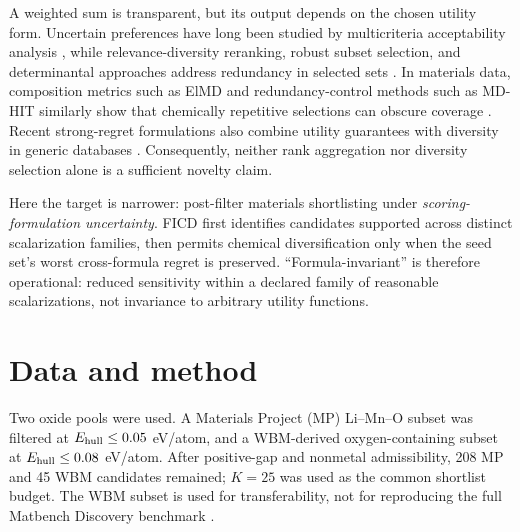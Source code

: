 \documentclass[final,5p,times,twocolumn]{elsarticle}
\begin{document}
A weighted sum is transparent, but its output depends on the chosen utility form. Uncertain preferences have long been studied by multicriteria acceptability analysis \cite{Lahdelma2001}, while relevance-diversity reranking, robust subset selection, and determinantal approaches address redundancy in selected sets \cite{Carbonell1998,Krause2008,Nava2022}. In materials data, composition metrics such as ElMD and redundancy-control methods such as MD-HIT similarly show that chemically repetitive selections can obscure coverage \cite{Hargreaves2020,Li2024}. Recent strong-regret formulations also combine utility guarantees with diversity in generic databases \cite{Guo2025}. Consequently, neither rank aggregation nor diversity selection alone is a sufficient novelty claim.

Here the target is narrower: post-filter materials shortlisting under \emph{scoring-formulation uncertainty}. FICD first identifies candidates supported across distinct scalarization families, then permits chemical diversification only when the seed set's worst cross-formula regret is preserved. ``Formula-invariant'' is therefore operational: reduced sensitivity within a declared family of reasonable scalarizations, not invariance to arbitrary utility functions.

\section{Data and method}
Two oxide pools were used. A Materials Project (MP) Li--Mn--O subset was filtered at $E_{\rm hull}\leq0.05$ eV/atom, and a WBM-derived oxygen-containing subset at $E_{\rm hull}\leq0.08$ eV/atom. After positive-gap and nonmetal admissibility, 208 MP and 45 WBM candidates remained; $K=25$ was used as the common shortlist budget. The WBM subset is used for transferability, not for reproducing the full Matbench Discovery benchmark \cite{Riebesell2025}.
\end{document}
